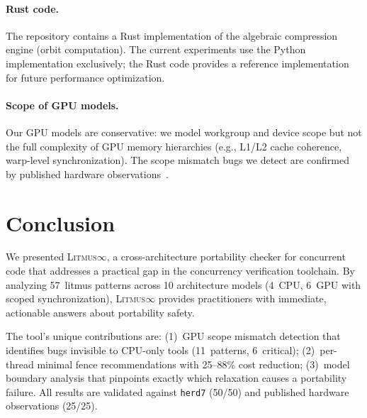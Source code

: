 \documentclass[10pt]{article}
\newcommand{\litmus}{\textsc{Litmus$\infty$}}
\begin{document}
\paragraph{Rust code.}
The repository contains a Rust implementation of the algebraic
compression engine (orbit computation). The current experiments use
the Python implementation exclusively; the Rust code provides a
reference implementation for future performance optimization.

\paragraph{Scope of GPU models.}
Our GPU models are conservative: we model workgroup and device scope
but not the full complexity of GPU memory hierarchies (e.g., L1/L2
cache coherence, warp-level synchronization). The scope mismatch bugs
we detect are confirmed by published hardware
observations~\cite{Sorensen2016, Alglave2015GPU}.

\section{Conclusion}
\label{sec:conclusion}

We presented \litmus{}, a cross-architecture portability checker for
concurrent code that addresses a practical gap in the concurrency
verification toolchain. By analyzing 57~litmus patterns across 10
architecture models (4~CPU, 6~GPU with scoped synchronization),
\litmus{} provides practitioners with immediate, actionable answers
about portability safety.

The tool's unique contributions are: (1)~GPU scope mismatch
detection that identifies bugs invisible to CPU-only tools
(11~patterns, 6~critical); (2)~per-thread minimal fence
recommendations with 25--88\% cost reduction; (3)~model boundary
analysis that pinpoints exactly which relaxation causes a
portability failure. All results are validated against \texttt{herd7}
(50/50) and published hardware observations (25/25).


\end{document}
